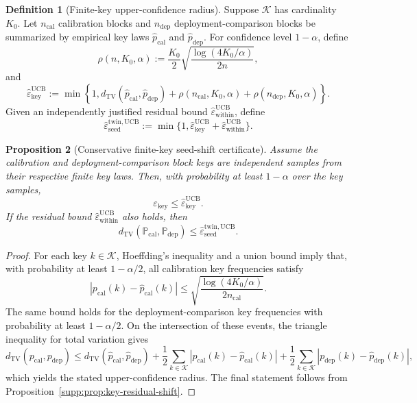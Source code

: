 \documentclass[11pt]{article}
\newcommand{\Prob}{\mathbb{P}}
\newcommand{\1}{\mathbf{1}}
\theoremstyle{definition}
\newtheorem{definition}{Definition}[section]
\theoremstyle{plain}
\newtheorem{proposition}[definition]{Proposition}
\theoremstyle{remark}
\begin{document}
\begin{definition}[Finite-key upper-confidence radius]
\label{supp:def:finite-key-radius}
Suppose $\mathcal K$ has cardinality $K_0$. Let $n_{\mathrm{cal}}$ calibration blocks and $n_{\mathrm{dep}}$ deployment-comparison blocks be summarized by empirical key laws $\widehat p_{\mathrm{cal}}$ and $\widehat p_{\mathrm{dep}}$. For confidence level $1-\alpha$, define
\[
\rho(n,K_0,\alpha)
:=
\frac{K_0}{2}
\sqrt{\frac{\log(4K_0/\alpha)}{2n}},
\]
and
\[
\widehat\varepsilon_{\mathrm{key}}^{\mathrm{UCB}}
:=
\min\!\left\{1,
 d_{\mathrm{TV}}(\widehat p_{\mathrm{cal}},\widehat p_{\mathrm{dep}})
 +\rho(n_{\mathrm{cal}},K_0,\alpha)
 +\rho(n_{\mathrm{dep}},K_0,\alpha)
\right\}.
\]
Given an independently justified residual bound $\widehat\varepsilon_{\mathrm{within}}^{\mathrm{UCB}}$, define
\[
\widehat\varepsilon_{\mathrm{seed}}^{\mathrm{twin,UCB}}
:=
\min\{1,
\widehat\varepsilon_{\mathrm{key}}^{\mathrm{UCB}}
+
\widehat\varepsilon_{\mathrm{within}}^{\mathrm{UCB}}
\}.
\]
\end{definition}

\begin{proposition}[Conservative finite-key seed-shift certificate]
\label{supp:prop:finite-key-radius}
Assume the calibration and deployment-comparison block keys are independent samples from their respective finite key laws. Then, with probability at least $1-\alpha$ over the key samples,
\[
\varepsilon_{\mathrm{key}}
\le
\widehat\varepsilon_{\mathrm{key}}^{\mathrm{UCB}}.
\]
If the residual bound $\widehat\varepsilon_{\mathrm{within}}^{\mathrm{UCB}}$ also holds, then
\[
 d_{\mathrm{TV}}(\Prob_{\mathrm{cal}},\Prob_{\mathrm{dep}})
\le
\widehat\varepsilon_{\mathrm{seed}}^{\mathrm{twin,UCB}}.
\]
\end{proposition}

\begin{proof}
For each key $k\in\mathcal K$, Hoeffding's inequality and a union bound imply that, with probability at least $1-\alpha/2$, all calibration key frequencies satisfy
\[
|p_{\mathrm{cal}}(k)-\widehat p_{\mathrm{cal}}(k)|
\le
\sqrt{\frac{\log(4K_0/\alpha)}{2n_{\mathrm{cal}}}}.
\]
The same bound holds for the deployment-comparison key frequencies with probability at least $1-\alpha/2$. On the intersection of these events, the triangle inequality for total variation gives
\[
 d_{\mathrm{TV}}(p_{\mathrm{cal}},p_{\mathrm{dep}})
\le
 d_{\mathrm{TV}}(\widehat p_{\mathrm{cal}},\widehat p_{\mathrm{dep}})
+
\frac{1}{2}\sum_{k\in\mathcal K}|p_{\mathrm{cal}}(k)-\widehat p_{\mathrm{cal}}(k)|
+
\frac{1}{2}\sum_{k\in\mathcal K}|p_{\mathrm{dep}}(k)-\widehat p_{\mathrm{dep}}(k)|,
\]
which yields the stated upper-confidence radius. The final statement follows from Proposition~\ref{supp:prop:key-residual-shift}.
\end{proof}
\end{document}
